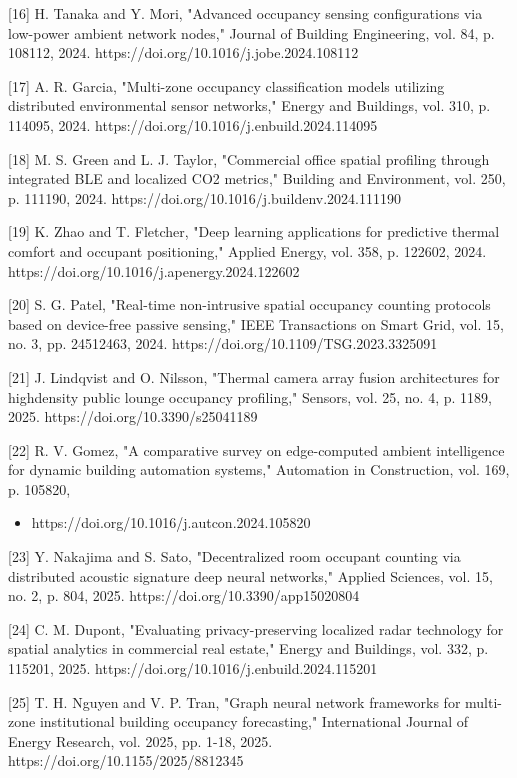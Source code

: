 [16] H. Tanaka and Y. Mori, "Advanced occupancy sensing configurations via low-power
ambient network nodes," Journal of Building Engineering, vol. 84, p. 108112, 2024.
https://doi.org/10.1016/j.jobe.2024.108112

[17] A. R. Garcia, "Multi-zone occupancy classification models utilizing distributed
environmental sensor networks," Energy and Buildings, vol. 310, p. 114095, 2024.
https://doi.org/10.1016/j.enbuild.2024.114095

[18] M. S. Green and L. J. Taylor, "Commercial office spatial profiling through integrated
BLE and localized CO2 metrics," Building and Environment, vol. 250, p. 111190, 2024.
https://doi.org/10.1016/j.buildenv.2024.111190

[19] K. Zhao and T. Fletcher, "Deep learning applications for predictive thermal comfort
and occupant positioning," Applied Energy, vol. 358, p. 122602, 2024.
https://doi.org/10.1016/j.apenergy.2024.122602

[20] S. G. Patel, "Real-time non-intrusive spatial occupancy counting protocols based on
device-free passive sensing," IEEE Transactions on Smart Grid, vol. 15, no. 3, pp. 24512463, 2024. https://doi.org/10.1109/TSG.2023.3325091

[21] J. Lindqvist and O. Nilsson, "Thermal camera array fusion architectures for highdensity public lounge occupancy profiling," Sensors, vol. 25, no. 4, p. 1189, 2025.
https://doi.org/10.3390/s25041189

[22] R. V. Gomez, "A comparative survey on edge-computed ambient intelligence for
dynamic building automation systems," Automation in Construction, vol. 169, p. 105820,
\begin{itemize}
  \item https://doi.org/10.1016/j.autcon.2024.105820
\end{itemize}

[23] Y. Nakajima and S. Sato, "Decentralized room occupant counting via distributed
acoustic signature deep neural networks," Applied Sciences, vol. 15, no. 2, p. 804, 2025.
https://doi.org/10.3390/app15020804

[24] C. M. Dupont, "Evaluating privacy-preserving localized radar technology for spatial
analytics in commercial real estate," Energy and Buildings, vol. 332, p. 115201, 2025.
https://doi.org/10.1016/j.enbuild.2024.115201

[25] T. H. Nguyen and V. P. Tran, "Graph neural network frameworks for multi-zone
institutional building occupancy forecasting," International Journal of Energy Research,
vol. 2025, pp. 1-18, 2025. https://doi.org/10.1155/2025/8812345

